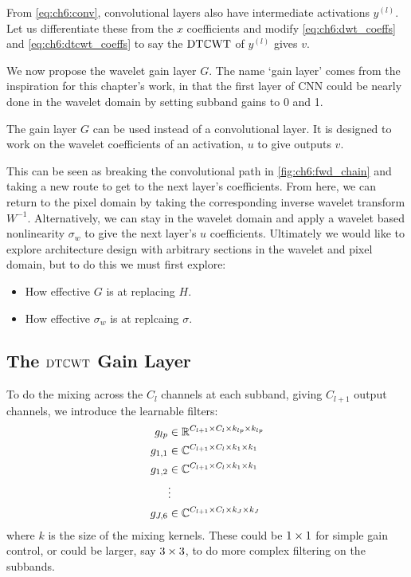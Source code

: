 From \eqref{eq:ch6:conv}, convolutional layers also have intermediate
activations $y^{(l)}$. Let us differentiate these from the $x$ coefficients and
modify \eqref{eq:ch6:dwt_coeffs} and \eqref{eq:ch6:dtcwt_coeffs} to say the 
$\DTCWT$ of $y^{(l)}$ gives $v$.

We now propose the wavelet gain layer $G$.
The name `gain layer' comes from the inspiration for this chapter's work, in
that the first layer of CNN could be nearly done in the wavelet domain by
setting subband gains to 0 and 1. 

The gain layer $G$ can be used instead of a convolutional layer. 
It is designed to work on the wavelet coefficients of an activation,
$u$ to give outputs $v$. 

This can be seen as breaking the convolutional path in
\autoref{fig:ch6:fwd_chain} and taking a new route to get to the next layer's
coefficients. From here, we can return to the pixel domain by taking the
corresponding inverse wavelet transform $W^{-1}$. Alternatively, we
can stay in the wavelet domain and apply a wavelet based nonlinearity $\sigma_w$
to give the next layer's $u$ coefficients. Ultimately we would like to explore
architecture design with arbitrary sections in the wavelet and pixel domain, but
to do this we must first explore: 
\begin{itemize}
  \item How effective $G$ is at replacing $H$.
  \item How effective $\sigma_w$ is at replcaing $\sigma$.
\end{itemize}

\subsection{The $\DTCWT$ Gain Layer}
To do the mixing across the $C_l$ channels at each subband, giving $C_{l+1}$
output channels, we introduce the learnable filters:
%
\begin{align}
  g_{lp} &\in \reals[C_{l+1}\x C_l\x k_{lp}\x k_{lp}] \label{eq:ch6:glp} \\
  g_{1,1} &\in \complexes[C_{l+1}\x C_l\x k_1\x k_1] \\
  g_{1,2} &\in \complexes[C_{l+1}\x C_l\x k_1\x k_1] \\
      & \vdots \nonumber \\
  g_{J,6} &\in \complexes[C_{l+1}\x C_l\x k_J\x k_J]  \label{eq:ch6:gj6}
\end{align}
%
where $k$ is the size of the mixing kernels. These could be $1\x 1$ for
simple gain control, or could be larger, say $3\x 3$, to do more complex
filtering on the subbands. 

